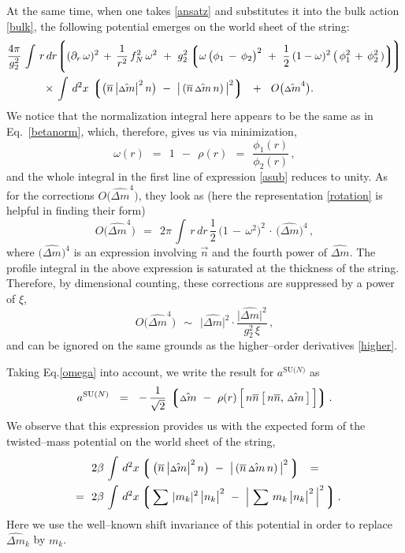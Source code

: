 \documentclass[12pt]{article}
\def\beq{\begin{equation}}
\def\eeq{\end{equation}}
\newcommand{\p}{\partial}
\newcommand{\ov}{\overline}
\newcommand{\lgr}{\left\lgroup}
\newcommand{\rgr}{\right\rgroup}
\newcommand{\aN}{a^\text{SU($N$)}}
\newcommand{\nbar}{\ov{n}}
\newcommand{\nnbar}{n\ov{n}}
\newcommand{\dm}{\hat{{\scriptstyle \Delta} m}}
\begin{document}
	At the same time, when  one takes \eqref{ansatz} and substitutes it into the bulk action \eqref{bulk},
	the following potential emerges on the world sheet of the string:
\begin{align}
%
\notag
	&
	\frac{4\pi}{g_2^2}\, \int\, r\, dr
		\Biggl\lgroup  (\p_r\, \omega)^2 \,+\, \frac{1}{r^2}\, f_N^2\, \omega^2 
			~+~  g_2^2 \lgr \omega\, \big( \phi_1 \,-\, \phi_2 \big)^2  ~+~
				\frac{1}{2}\, (1 - \omega)^2\, \big(\, \phi_1^2 \,+\, \phi_2^2 \,) \rgr
		\!\Biggr\rgroup
	\\
%
\label{asub}
	&
	\qquad\quad~
	\times\,
	\int\, d^2x\,
	\lgr  \big( \nbar\, \big| \dm \big|^2\, n \big)  ~-~  \big|\, ( \nbar\, \dm\, n ) \,\big|^2  \rgr
	~~+~~
	O \big( \dm^4 \big).
\end{align}
	We notice that the normalization integral here appears to be the same as in Eq.~\eqref{betanorm},
	which, therefore, gives us via minimization, 
\beq
\label{omega}
	\omega(r)    ~~=~~    1  ~~-~~ \rho(r)    ~~=~~    \frac{\phi_1(r)}{\phi_2(r)}\,,
\eeq
	and the whole integral in the first line of expression \eqref{asub} reduces to unity.
	As for the corrections $ O \big( \dm^4 \big) $, they look as (here 
	the representation \eqref{rotation} is helpful in finding their form)
\beq
	O \big( \dm^4 \big)    ~~=~~    
	2\pi\, \int\, r\, dr\, \frac{1}{2}\, \big( 1 \,-\, \omega^2 \big)^2 \,\cdot\, \big( \dm \big)^4 \,,
\eeq
	where $ \big( \dm \big)^4 $ is an expression involving $ \vec{n} $ and the fourth power of $ \dm $.
	The profile integral in the above expression is saturated at the thickness of the string.
	Therefore, by dimensional counting, these corrections are suppressed by a power of $ \xi $,
\beq
	O \big( \dm^4 \big)    ~~\sim~~    \big| \dm \big|^2 \cdot \frac{ \big| \dm \big|^2 }{ g_2^2\, \xi }\,,
\eeq
	and can be ignored on the same grounds as the higher--order derivatives \eqref{higher}.

	Taking Eq.\eqref{omega} into account, we write the result for $ \aN $ as
\beq
\label{aN}
	\aN    ~~=~~    
	-\, \frac{1}{\sqrt{2}}\, 
	\lgr \dm  ~-~  \rho(r)\, \Big[\, \nnbar\, \big[\, \nnbar,\, \dm \,\big] \,\Big] \rgr.
\eeq
	We observe that this expression provides us with the expected form of the 
	twisted--mass potential on the world sheet of the string,
\begin{align}
%
\notag
	& 2\beta\, \int\, d^2x \lgr\,  \big( \nbar\, \big| \dm \big|^2\, n \big)  ~-~  \big|\, ( \nbar\, \dm\, n ) \,\big|^2  \,\rgr
	~~=~~ 
	\\
%
\label{twpot}
	~~=~~ &
	2\beta\, \int\, d^2x \lgr\, \sum\, | m_k |^2\, \big| n_k \big|^2   ~-~  \Big|\, \sum\, m_k\, \big| n_k \big|^2 \,\Big|^2 \,\rgr.
\end{align}
	Here we use  the well--known shift invariance of this potential in order to replace $ \dm{}_k $ by $ m_k $.
\end{document}
